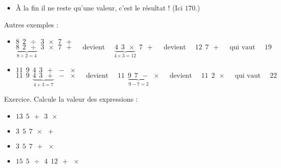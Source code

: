 \documentclass[11pt,class=report,crop=false]{standalone}
\begin{document}
\begin{cours}
\begin{itemize}
  \item 	À la fin il ne reste qu'une valeur, c'est le résultat ! (Ici $170$.)
\end{itemize}

\bigskip

Autres exemples :
\begin{itemize}
  \item $8 \ \ 2 \ \ \div \ \ 3 \ \ \times \ \ 7 \ \ +$  
$$\underbrace{8 \ \ 2 \ \ \div}_{8 \div 2 = 4} \ \ 3 \ \ \times \ \ 7 \ \ +
\quad\text{ devient }\quad
\underbrace{4 \ \ 3 \ \ \times}_{4 \times 3 = 12} \ \ 7 \ \ + 
\quad\text{ devient }\quad
 12 \ \ 7 \ \ +
\quad\text{ qui vaut }\quad
19$$ 
 
  \item $11 \ \ 9 \ \ 4 \ \ 3 \ \ + \ \ - \ \ \times$  
$$11 \ \ 9 \ \ \underbrace{4 \ \ 3 \ \ +}_{4+3=7} \ \ - \ \ \times
\quad\text{ devient }\quad
11 \ \ \underbrace{9 \ \ 7 \ \ -}_{9 - 7 = 2} \ \ \times 
\quad\text{ devient }\quad
11 \ \ 2 \ \ \times
\quad\text{ qui vaut }\quad
22$$ 
\end{itemize}  

Exercice. Calcule la valeur des expressions :
\begin{itemize}
  \item $13 \ \ 5 \ \ + \ \ 3 \ \ \times$
  \item $3 \ \ 5 \ \ 7 \ \ \times \ \ +$
  \item $3 \ \ 5 \ \ 7 \ \ + \ \ \times$  
  \item $15 \ \ 5 \ \ \div \ \ 4 \ \ 12 \ \ + \ \ \times$
\end{itemize}

\end{cours}

\end{document}
